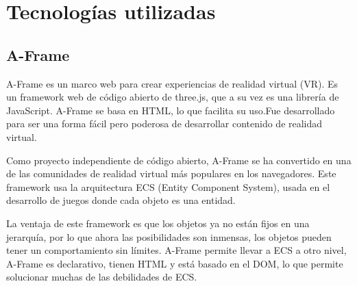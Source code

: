 \documentclass[a4paper, 12pt]{book}
\begin{document}

\cleardoublepage
\chapter{Tecnologías utilizadas}
\label{chap:tecnologias}


\section{A-Frame}
\label{sec:A-Frame}
A-Frame es un marco web para crear experiencias de realidad virtual (VR). Es un framework web de código abierto de three.js, que a su vez es una librería de JavaScript.
A-Frame se basa en HTML, lo que facilita su uso.Fue desarrollado para ser una forma fácil pero poderosa de desarrollar contenido de realidad virtual.

Como proyecto independiente de código abierto, A-Frame se ha convertido en una de las comunidades de realidad virtual más populares en los navegadores.
Este framework usa la arquitectura ECS (Entity Component System), usada en el desarrollo de juegos donde cada objeto es una entidad.

La ventaja de este framework es que los objetos ya no están fijos en una jerarquía, por lo que ahora las posibilidades son inmensas, los objetos pueden tener un comportamiento sin límites. A-Frame permite llevar a ECS a otro nivel, A-Frame es declarativo, tienen HTML y está basado en el DOM, lo que permite solucionar muchas de las debilidades de ECS.
\end{document}
